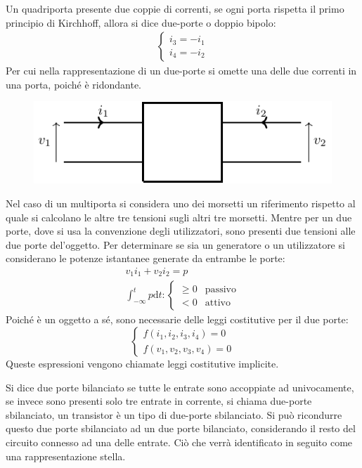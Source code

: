 \documentclass{article}
\newcommand{\df}{\mathrm{d}}
\numberwithin{equation}{subsection}
\begin{document}
Un quadriporta presente due coppie di correnti, se ogni porta rispetta il primo principio di Kirchhoff, allora si dice due-porte o doppio bipolo:
\begin{gather*}
    \begin{cases}
        i_3=-i_1\\
        i_4=-i_2
    \end{cases}
\end{gather*}
Per cui nella rappresentazione di un due-porte si omette una delle due correnti in una porta, poiché è ridondante. 
\begin{figure}[H]%
    \centering
    \includegraphics{due-porte-generico.pdf}%
    \label{fig:due-porte}
\end{figure}
Nel caso di un multiporta si considera uno dei morsetti un riferimento rispetto al quale si calcolano le altre tre tensioni sugli altri tre morsetti. 
Mentre per un due porte, dove si usa la convenzione degli utilizzatori, 
sono presenti due tensioni alle due porte del'oggetto. Per determinare se sia un generatore o un utilizzatore si considerano 
le potenze istantanee generate da entrambe le porte:
\begin{gather*}
    v_1i_1+v_2i_2=p\\
    \displaystyle\int_{-\infty}^tp \df t:\begin{cases}
        \geq0&\mbox{passivo}\\
        <0&\mbox{attivo}
    \end{cases}
\end{gather*} 
Poiché è un oggetto a sé, sono necessarie delle leggi costitutive per il due porte:
\begin{equation*}
    \begin{cases}
        f(i_1,i_2,i_3,i_4)=0\\
        f(v_1,v_2,v_3,v_4)=0
    \end{cases}
\end{equation*}
Queste espressioni vengono chiamate leggi costitutive implicite. 


Si dice due porte bilanciato se tutte le entrate sono accoppiate ad univocamente, se invece sono presenti solo tre entrate in corrente, si chiama due-porte sbilanciato, 
un transistor è un tipo di due-porte sbilanciato. Si può ricondurre questo due porte sbilanciato ad un due porte bilanciato, considerando il resto del circuito connesso 
ad una delle entrate. Ciò che verrà identificato in seguito come una rappresentazione stella. 
\end{document}
